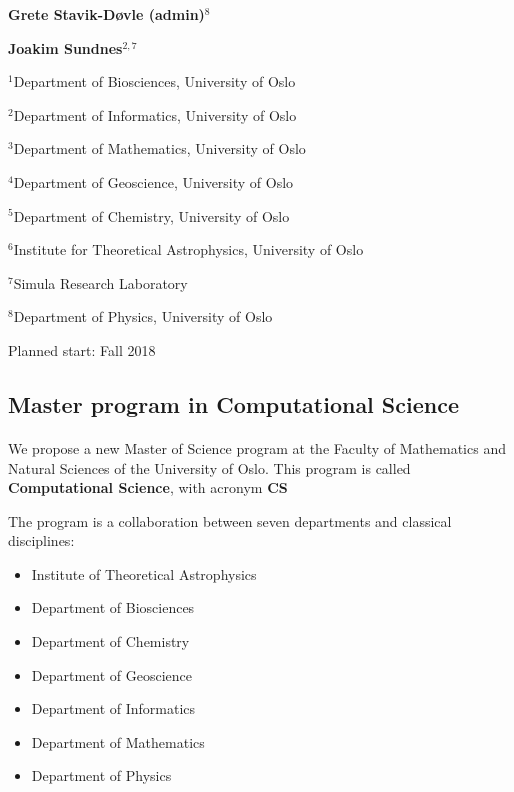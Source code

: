 \documentclass[%
oneside,                 %
final,                   %
10pt]{article}
\begin{document}
\begin{center}
{\bf Grete Stavik-Døvle (admin)${}^{8}$} \\ [0mm]
\end{center}


\begin{center}
{\bf Joakim Sundnes${}^{2, 7}$} \\ [0mm]
\end{center}

\begin{center}
\centerline{{\small ${}^1$Department of Biosciences, University of Oslo}}
\centerline{{\small ${}^2$Department of Informatics, University of Oslo}}
\centerline{{\small ${}^3$Department of Mathematics, University of Oslo}}
\centerline{{\small ${}^4$Department of Geoscience, University of Oslo}}
\centerline{{\small ${}^5$Department of Chemistry, University of Oslo}}
\centerline{{\small ${}^6$Institute for Theoretical Astrophysics, University of Oslo}}
\centerline{{\small ${}^7$Simula Research Laboratory}}
\centerline{{\small ${}^8$Department of Physics, University of Oslo}}
\end{center}
    


\begin{center}
Planned start: Fall 2018
\end{center}

\vspace{1cm}


\subsection*{Master program in Computational Science}

\paragraph{}
We propose a new Master of Science program at the Faculty of Mathematics and Natural Sciences of the University of Oslo. This program is called  \textbf{Computational Science}, with acronym  \textbf{CS}

The program is a collaboration between seven departments and classical disciplines:

\begin{itemize}
 \item Institute of Theoretical Astrophysics

 \item Department of Biosciences

 \item Department of Chemistry

 \item Department of Geoscience

 \item Department of Informatics

 \item Department of Mathematics

 \item Department of Physics
\end{itemize}
\end{document}
